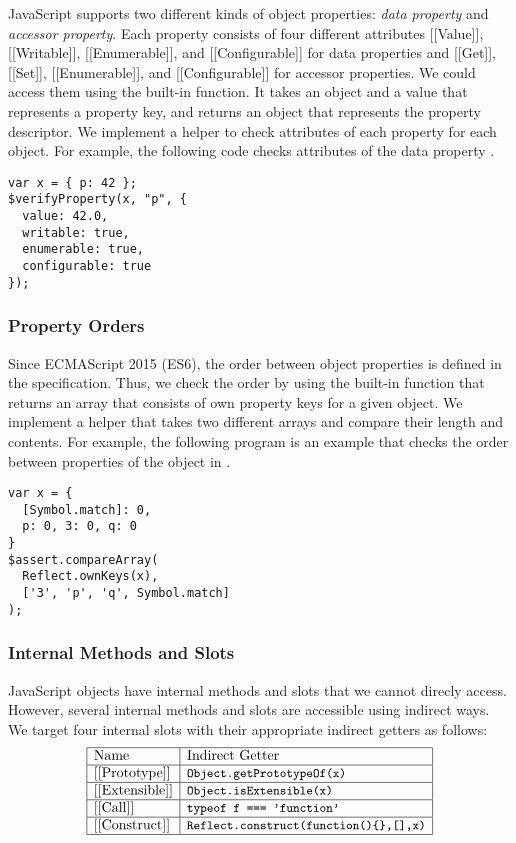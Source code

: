 JavaScript supports two different kinds of object properties: \textit{data
property} and \textit{accessor property}.  Each property consists of four
different attributes [[Value]], [[Writable]], [[Enumerable]], and
[[Configurable]] for data properties and [[Get]], [[Set]], [[Enumerable]], and
[[Configurable]] for accessor properties.  We could access them using the
 built-in function.  It takes an object
and a value that represents a property key, and returns an object that
represents the property descriptor.  We implement a helper
 to check attributes of each property for each object.
For example, the following code checks attributes of the data property
.
\begin{lstlisting}[style=myJSstyle]
var x = { p: 42 };
$verifyProperty(x, "p", {
  value: 42.0,
  writable: true,
  enumerable: true,
  configurable: true
});
\end{lstlisting}


\subsubsection{Property Orders}

Since ECMAScript 2015 (ES6), the order between object properties is defined in
the specification.  Thus, we check the order by using the 
built-in function that returns an array that consists of own property keys for a
given object.  We implement a helper  that takes two
different arrays and compare their length and contents.  For example, the
following program is an example that checks the order between properties of
the object in .
\begin{lstlisting}[style=myJSstyle]
var x = {
  [Symbol.match]: 0,
  p: 0, 3: 0, q: 0
}
$assert.compareArray(
  Reflect.ownKeys(x),
  ['3', 'p', 'q', Symbol.match]
);
\end{lstlisting}


\subsubsection{Internal Methods and Slots}

JavaScript objects have internal methods and slots that we cannot direcly
access.  However, several internal methods and slots are accessible using
indirect ways.  We target four internal slots with their appropriate indirect
getters as follows:
\[
  \begin{array}{|l|l|}\hline
    \text{Name}           & \text{Indirect Getter}\\\hline
    \text{[[Prototype]]}  & \code{Object.getPrototypeOf(x)}\\\hline
    \text{[[Extensible]]} & \code{Object.isExtensible(x)}\\\hline
    \text{[[Call]]}       & \code{typeof f === 'function'}\\\hline
    \text{[[Construct]]}  & \code{Reflect.construct(function()\string{\string},[],x)}\\\hline
  \end{array}
\]

